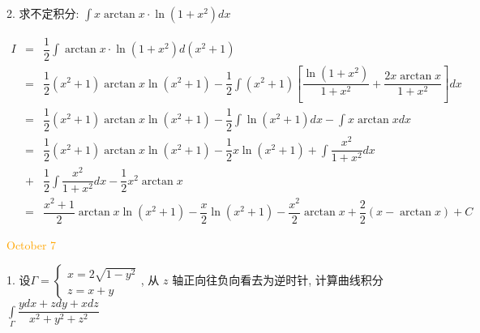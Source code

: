 2. 求不定积分: $\displaystyle{\int x\arctan x\cdot \ln(1+x^2)dx}$

\begin{solution}

	\begin{eqnarray*}
		I & = & \dfrac{1}{2}\int \arctan x\cdot \ln(1+x^2)d(x^2+1)\\
		  & = & \dfrac{1}{2}(x^2+1)\arctan x\ln(x^2+1)-\dfrac{1}{2}\int (x^{2}+1)\left[\dfrac{\ln(1+x^{2})}{1+x^{2}}+\dfrac{2x\arctan x}{1+x^{2}}\right]dx\\
		  & = & \dfrac{1}{2}(x^2+1)\arctan x\ln(x^2+1)-\dfrac{1}{2}\int \ln(x^2+1)dx-\int x\arctan xdx\\
		  & = & \dfrac{1}{2}(x^2+1)\arctan x\ln(x^2+1)-\dfrac{1}{2}x\ln(x^2+1) + \int \dfrac{x^{2}}{1+x^{2}}dx\\
		  & + & \dfrac{1}{2}\int \dfrac{x^{2}}{1+x^{2}}dx - \dfrac{1}{2}x^2\arctan x\\
		  & = & \dfrac{x^{2}+1}{2}\arctan x\ln(x^{2}+1) -\dfrac{x}{2}\ln(x^{2}+1) - \dfrac{x^{2}}{2}\arctan x +\dfrac{2}{2}(x-\arctan x) + C
	\end{eqnarray*}
\end{solution}


\textcolor{orange}{October 7}

1. 设$\varGamma = 
\begin{cases}
	x = 2\sqrt{1-y^2}\\
	z = x+y
\end{cases}$, 从 $z$ 轴正向往负向看去为逆时针, 计算曲线积分 
$\displaystyle{\int\limits_{\varGamma}\dfrac{ydx+zdy+xdz}{x^2+y^2+z^2}}$


